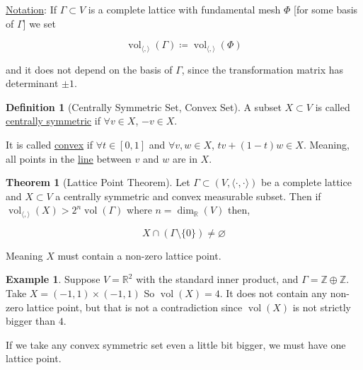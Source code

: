 \documentclass[openany]{amsbook}
\numberwithin{section}{chapter}
\theoremstyle{definition}
\newtheorem*{example}{Example}
\newtheorem*{definition}{Definition}
\newtheorem{theorem}{Theorem}[chapter]
\begin{document}
\underline{Notation}: If \(\Gamma \subset V\) is a complete lattice with fundamental mesh \(\Phi\) [for some basis of \(\Gamma\)] we set

\[
    \operatorname{vol}_{\langle , \rangle }(\Gamma) \coloneqq \operatorname{vol}_{\langle , \rangle} (\Phi)
\]

and it does not depend on the basis of \(\Gamma\), since the transformation matrix has determinant \(\pm 1\).

\begin{definition}
    [Centrally Symmetric Set, Convex Set]

    A subset \(X \subset V\) is called \underline{centrally symmetric} if \(\forall v\in X\), \(-v \in X\).

    It is called \underline{convex} if \(\forall t\in [0,1]\) and \(\forall v,w\in X\), \(tv + (1-t)w \in X\). Meaning, all points in the \underline{line} between \(v\) and \(w\) are in \(X\).
\end{definition}

\begin{theorem}
    [Lattice Point Theorem] Let \(\Gamma \subset (V, \langle\cdot,\cdot\rangle)\) be a complete lattice and \(X \subset V\) a centrally symmetric and convex measurable subset. Then if \(\operatorname{vol}_{\langle , \rangle}(X) > 2^n \operatorname{vol}(\Gamma)\) where \(n = \operatorname{\dim }_\mathbb{R} (V)\) then,
    
    \[
        X \cap (\Gamma \setminus \{ 0 \}) \neq \varnothing
    \]

    Meaning \(X\) must contain a non-zero lattice point.
\end{theorem}

\begin{example}
    Suppose \(V = \mathbb{R}^2\) with the standard inner product, and \(\Gamma = \mathbb{Z} \oplus \mathbb{Z}\). Take \(X = (-1,1) \times (-1,1)\) So \(\operatorname{vol}(X) = 4\). It does not contain any non-zero lattice point, but that is not a contradiction since \(\operatorname{vol}(X)\) is not strictly bigger than \(4\).

    If we take any convex symmetric set even a little bit bigger, we must have one lattice point.

\end{example}
\end{document}
